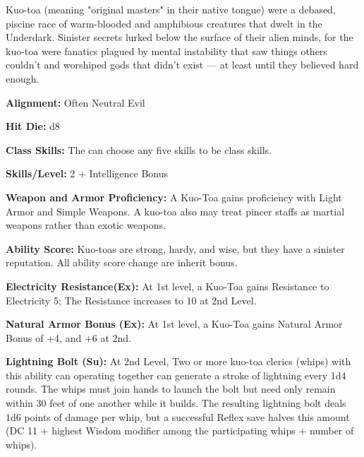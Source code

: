 
Kuo-toa (meaning "original masters" in their native tongue) were a debased, piscine race of warm-blooded and amphibious creatures that dwelt in the Underdark. Sinister secrets lurked below the surface of their alien minds, for the kuo-toa were fanatics plagued by mental instability that saw things others couldn't and worshiped gods that didn't exist — at least until they believed hard enough.

\textbf{Alignment:} Often Neutral Evil

\textbf{Hit Die:} d8

\textbf{Class Skills:} The \currentclassname{} can choose any five skills to be class skills.

\textbf{Skills/Level:} 2 + Intelligence Bonus

\goodbab{}
\poorfor{}
\goodref{}
\goodwil{}

\begin{classtable}
\end{classtable}

\classfeatures

\textbf{Weapon and Armor Proficiency:} A Kuo-Toa gains proficiency with Light Armor and Simple Weapons. A kuo-toa also may treat pincer staffs as martial weapons rather than exotic weapons.

\textbf{Ability Score:} Kuo-toas are strong, hardy, and wise, but they have a sinister reputation. All ability score change are inherit bonus.
 
 \textbf{Electricity Resistance(Ex):} At 1st level, a Kuo-Toa gains Resistance to Electricity 5; The Resistance increases to 10 at 2nd Level.
 
 \textbf{Natural Armor Bonus (Ex):} At 1st level, a Kuo-Toa gains Natural Armor Bonus of +4, and +6 at 2nd.
 
\textbf{Lightning Bolt (Su):} At 2nd Level, Two or more kuo-toa clerics (whips) with this ability can operating together can generate a stroke of lightning every 1d4 rounds. The whips must join hands to launch the bolt but need only remain within 30 feet of one another while it builds. The resulting lightning bolt deals 1d6 points of damage per whip, but a successful Reflex save halves this amount (DC 11 + highest Wisdom modifier among the participating whips + number of whips).